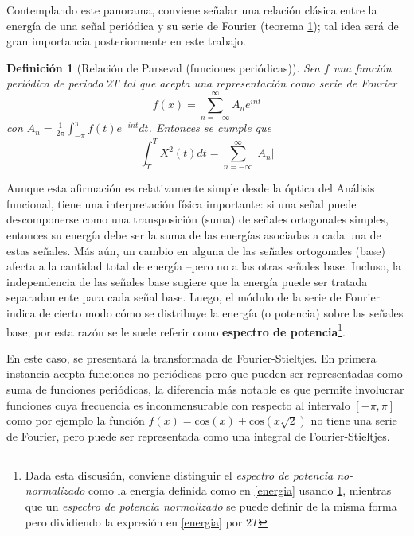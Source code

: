 \documentclass[12pt,a4paper]{mitthesis}
\newtheorem{defn}{Definici\'on}
\newcommand{\intPI}{\int_{-\pi}^{\pi}}
\newcommand{\COS}[1]{\mathrm{cos}\left( #1 \right)}
\newcommand{\abso}[1]{\left| #1 \right|}
\begin{document}
Contemplando este panorama, conviene se\~nalar una relaci\'on cl\'asica entre la energ\'ia de una 
se\~nal peri\'odica y su serie de Fourier (teorema \ref{parseval_serie}); tal idea ser\'a de gran 
importancia posteriormente en este trabajo.  

\begin{defn}[Relaci\'on de Parseval (funciones peri\'odicas)]
Sea $f$ una funci\'on peri\'odica de periodo $2T$ tal que acepta una representaci\'on como serie de 
Fourier
\begin{equation*}
f(x) = \sum_{n=-\infty}^{\infty} A_n e^{i n t}
\end{equation*}
con $A_n = \frac{1}{2\pi} \intPI f(t) e^{- i n t} dt$. Entonces se cumple que
\begin{equation*}
\int_T^{T} X^{2}(t) dt = \sum_{n=-\infty}^{\infty} \abso{A_n}
\end{equation*}
\label{parseval_serie}
\end{defn}

Aunque esta afirmaci\'on es relativamente simple desde la \'optica del An\'alisis funcional, tiene 
una interpretaci\'on f\'isica importante: si una se\~nal puede descomponerse como una 
transposici\'on (suma) de se\~nales ortogonales simples, entonces su energ\'ia debe ser la suma de 
las energ\'ias asociadas a cada una de estas se\~nales. M\'as a\'un, un cambio en alguna de las 
se\~nales ortogonales (base) afecta a la cantidad total de energ\'ia --pero no a las otras 
se\~nales base.
Incluso, la independencia de las se\~nales base sugiere que la energ\'ia puede ser tratada 
separadamente para cada se\~nal base. Luego, el m\'odulo de la serie de Fourier indica de cierto 
modo c\'omo se distribuye la energ\'ia (o potencia) sobre las se\~nales base; por esta raz\'on se 
le suele referir como \textbf{espectro de potencia}\footnote{Dada esta discusi\'on, conviene 
distinguir el \textit{espectro de potencia no-normalizado} como la energ\'ia definida como en 
\ref{energia} usando \ref{parseval_serie}, mientras que un \textit{espectro de potencia 
normalizado} se puede definir de la misma forma pero dividiendo la expresi\'on en \ref{energia} por 
$2T$}.

En este caso, se presentar\'a la transformada de Fourier-Stieltjes. En primera instancia acepta 
funciones no-peri\'odicas pero que pueden ser representadas como suma de funciones peri\'odicas, la 
diferencia m\'as notable es que permite involucrar funciones cuya frecuencia es inconmensurable con 
respecto al intervalo $[-\pi,\pi]$ como por ejemplo la funci\'on $f(x) = \COS{x} + \COS{x\sqrt{2}}$
no tiene una serie de Fourier, pero puede ser representada como una integral de Fourier-Stieltjes.
\end{document}
